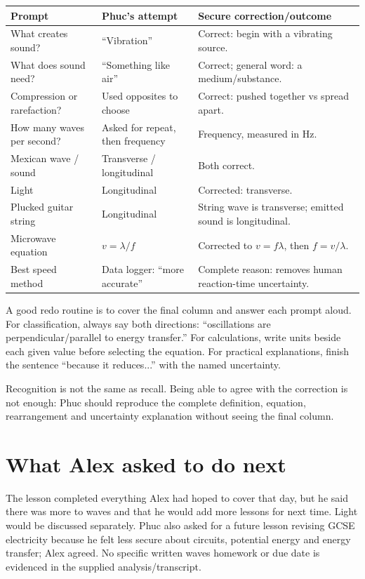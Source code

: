 \documentclass[11pt,a4paper]{article}
\newcommand{\trap}[1]{\begin{mistakebox}#1\end{mistakebox}}
\begin{document}
\begin{center}
\begin{tabular}{p{4.1cm}p{4cm}p{6.1cm}}
\toprule Prompt & Phuc's attempt & Secure correction/outcome \\ \midrule
What creates sound? & ``Vibration'' & Correct: begin with a vibrating source. \\
What does sound need? & ``Something like air'' & Correct; general word: a medium/substance. \\
Compression or rarefaction? & Used opposites to choose & Correct: pushed together vs spread apart. \\
How many waves per second? & Asked for repeat, then frequency & Frequency, measured in Hz. \\
Mexican wave / sound & Transverse / longitudinal & Both correct. \\
Light & Longitudinal & Corrected: transverse. \\
Plucked guitar string & Longitudinal & String wave is transverse; emitted sound is longitudinal. \\
Microwave equation & $v=\lambda/f$ & Corrected to $v=f\lambda$, then $f=v/\lambda$. \\
Best speed method & Data logger: ``more accurate'' & Complete reason: removes human reaction-time uncertainty. \\ \bottomrule
\end{tabular}
\end{center}

A good redo routine is to cover the final column and answer each prompt aloud. For classification, always say both directions: ``oscillations are perpendicular/parallel to energy transfer.'' For calculations, write units beside each given value before selecting the equation. For practical explanations, finish the sentence ``because it reduces...'' with the named uncertainty.

\trap{Recognition is not the same as recall. Being able to agree with the correction is not enough: Phuc should reproduce the complete definition, equation, rearrangement and uncertainty explanation without seeing the final column.}

\section{What Alex asked to do next}
The lesson completed everything Alex had hoped to cover that day, but he said there was more to waves and that he would add more lessons for next time. Light would be discussed separately. Phuc also asked for a future lesson revising GCSE electricity because he felt less secure about circuits, potential energy and energy transfer; Alex agreed. No specific written waves homework or due date is evidenced in the supplied analysis/transcript.
\end{document}
